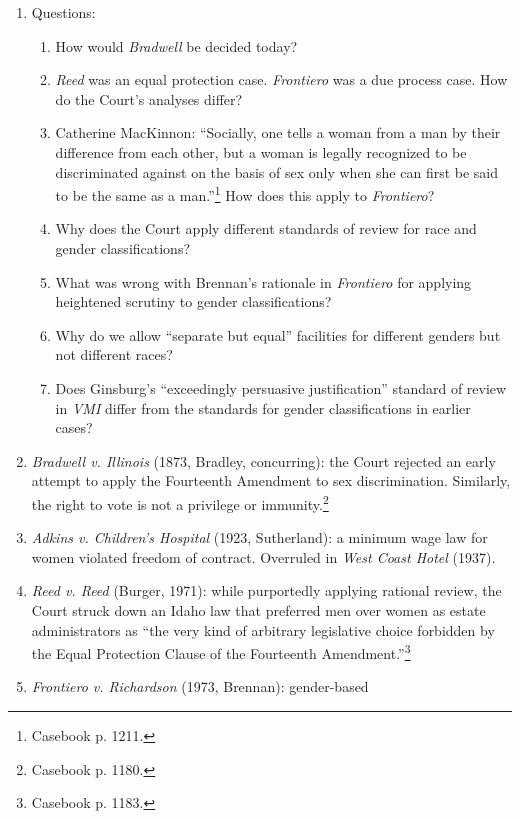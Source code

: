 \begin{enumerate}
    \item Questions:
    \begin{enumerate}
        \item How would \emph{Bradwell} be decided today?
        \item \emph{Reed} was an equal protection case. \emph{Frontiero} was a 
        due process case. How do the Court's analyses differ?
        \item Catherine MacKinnon: ``Socially, one tells a woman from a man by 
        their difference from each other, but a woman is legally recognized to 
        be discriminated against on the basis of sex only when she can first 
        be said to be the same as a man.''\footnote{Casebook p. 1211.} How 
        does this apply to \emph{Frontiero}?
        \item Why does the Court apply different standards of review for race 
        and gender classifications?
        \item What was wrong with Brennan's rationale in \emph{Frontiero} for 
        applying heightened scrutiny to gender classifications?
        \item Why do we allow ``separate but equal'' facilities for different 
        genders but not different races?
        \item Does Ginsburg's ``exceedingly persuasive justification'' 
        standard of review in \emph{VMI} differ from the standards for gender 
        classifications in earlier cases?
    \end{enumerate}
    \item \emph{Bradwell v. Illinois} (1873, Bradley, concurring): the Court 
    rejected an early attempt to apply the Fourteenth Amendment to sex 
    discrimination. Similarly, the right to vote is not a privilege or 
    immunity.\footnote{Casebook p. 1180.}
    \item \emph{Adkins v. Children's Hospital} (1923, Sutherland): a minimum 
    wage law for women violated freedom of contract. Overruled in \emph{West 
    Coast Hotel} (1937).
    \item \emph{Reed v. Reed} (Burger, 1971): while purportedly applying 
    rational review, the Court struck down an Idaho law that preferred men 
    over women as estate administrators as ``the very kind of arbitrary 
    legislative choice forbidden by the Equal Protection Clause of the 
    Fourteenth Amendment.''\footnote{Casebook p. 1183.}
    \item \emph{Frontiero v. Richardson} (1973, Brennan): gender-based 

\end{enumerate}
